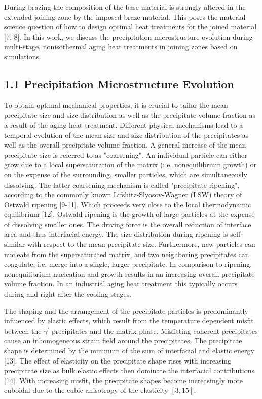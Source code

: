 \documentclass[10pt]{article}
\begin{document}
During brazing the composition of the base material is strongly altered in the extended joining zone by the imposed braze material. This poses the material science question of how to design optimal heat treatments for the joined material [7, 8]. In this work, we discuss the precipitation microstructure evolution during multi-stage, nonisothermal aging heat treatments in joining zones based on simulations.

\subsection*{1.1 Precipitation Microstructure Evolution}
To obtain optimal mechanical properties, it is crucial to tailor the mean precipitate size and size distribution as well as the precipitate volume fraction as a result of the aging heat treatment. Different physical mechanisms lead to a temporal evolution of the mean size and size distribution of the precipitates as well as the overall precipitate volume fraction. A general increase of the mean precipitate size is referred to as "coarsening". An individual particle can either grow due to a local supersaturation of the matrix (i.e. nonequilibrium growth) or on the expense of the surrounding, smaller particles, which are simultaneously dissolving. The latter coarsening mechanism is called "precipitate ripening", according to the commonly known Lifshitz-Slyosov-Wagner (LSW) theory of Ostwald ripening [9-11]. Which proceeds very close to the local thermodynamic equilibrium [12]. Ostwald ripening is the growth of large particles at the expense of dissolving smaller ones. The driving force is the overall reduction of interface area and thus interfacial energy. The size distribution during ripening is self-similar with respect to the mean precipitate size. Furthermore, new particles can nucleate from the supersaturated matrix, and two neighboring precipitates can coagulate, i.e. merge into a single, larger precipitate. In comparison to ripening, nonequilibrium nucleation and growth results in an increasing overall precipitate volume fraction. In an industrial aging heat treatment this typically occurs during and right after the cooling stages.

The shaping and the arrangement of the precipitate particles is predominantly influenced by elastic effects, which result from the temperature dependent misfit between the $\gamma^{\prime}$-precipitates and the matrix-phase. Misfitting coherent precipitates cause an inhomogeneous strain field around the precipitates. The precipitate shape is determined by the minimum of the sum of interfacial and elastic energy [13]. The effect of elasticity on the precipitate shape rises with increasing precipitate size as bulk elastic effects then dominate the interfacial contributions [14]. With increasing misfit, the precipitate shapes become increasingly more cuboidal due to the cubic anisotropy of the elasticity $[3,15]$.
\end{document}
